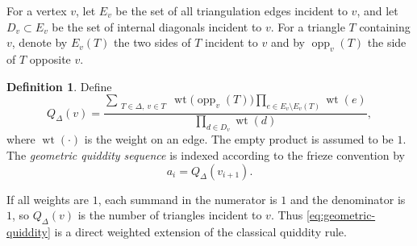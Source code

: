 \documentclass[amstex,11pt,reqno]{amsart}
\theoremstyle{definition}
\newtheorem{definition}[theorem]{Definition}
\newcommand{\wt}{\operatorname{wt}}
\begin{document}
For a vertex $v$, let $E_v$ be the set of all triangulation edges incident to $v$, and let $D_v\subset E_v$ be the set of internal diagonals incident to $v$. For a triangle $T$ containing $v$, denote by $E_v(T)$ the two sides of $T$ incident to $v$ and 
by $\operatorname{opp}_v(T)$ the side of $T$ opposite $v$.

\begin{definition}\label{def:Q}
Define
\begin{equation}\label{eq:geometric-quiddity}
 Q_\Delta(v)=
 \frac{
 \displaystyle\sum_{\substack{T\in\Delta,\ v\in T}}
 \wt\bigl(\operatorname{opp}_v(T)\bigr)
 \displaystyle\prod_{e\in E_v\setminus E_v(T)}\wt(e)
 }{
 \displaystyle\prod_{d\in D_v}\wt(d)
 },
\end{equation}
where $\wt(\cdot)$ is the weight on an edge.
The empty product is assumed to be $1$. The \emph{geometric quiddity sequence} is indexed according to the frieze convention by
\begin{equation}\label{eq:Q-index}
 a_i=Q_\Delta(v_{i+1}).
\end{equation}
\end{definition}

If all weights are $1$, each summand in the numerator is $1$ and the denominator is $1$, so $Q_\Delta(v)$ is the number of triangles incident to $v$. Thus \eqref{eq:geometric-quiddity} is a direct weighted extension of the classical quiddity rule.
\end{document}
